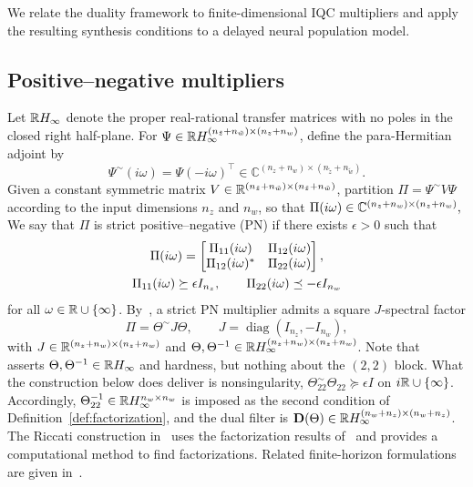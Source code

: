 We relate the duality framework to finite-dimensional IQC multipliers and
apply the resulting synthesis conditions to a delayed neural population
model.

\subsection{Positive--negative multipliers}

Let $\mathbb{R} H_\infty$ denote the proper real-rational transfer matrices with
no poles in the closed right half-plane. For
$\Psi\in\mathbb{R} H_\infty^{(n_{\tilde z}+n_{\tilde w})\times(n_z+n_w)}$,
define the para-Hermitian adjoint by
\begin{equation*}
 \Psi^\sim(i\omega)=\Psi(-i\omega)^\top
 \in\mathbb C^{(n_z+n_w)\times(n_{\tilde z}+n_{\tilde w})}.
\end{equation*}
Given a constant symmetric matrix
$V\in\mathbb{R}^{(n_{\tilde z}+n_{\tilde w})\times(n_{\tilde z}+n_{\tilde w})}$,
partition $\Pi=\Psi^\sim V\Psi$ according to the input dimensions
$n_z$ and $n_w$, so that \(
 \Pi(i\omega)\in\mathbb C^{(n_z+n_w)\times(n_z+n_w)},\\
\)
We say that $\Pi$ is strict positive--negative (PN)
if there exists $\epsilon>0$ such that
\begin{equation*}
 \begin{gathered}
 \Pi(i\omega)=
 \begin{bmatrix}\Pi_{11}(i\omega)&\Pi_{12}(i\omega)\\
       \Pi_{12}(i\omega)^*&\Pi_{22}(i\omega)\end{bmatrix},\\
 \Pi_{11}(i\omega)\succeq\epsilon I_{n_z},\qquad
 \Pi_{22}(i\omega)\preceq-\epsilon I_{n_w}
 \end{gathered}
\end{equation*}
for all $\omega\in\mathbb{R}\cup\{\infty\}$. By~\cite[Thm.~4]{6915700}, a
strict PN multiplier admits a square $J$-spectral factor
\begin{equation*}
\Pi=\Theta^\sim J\Theta,
 \qquad J=\operatorname{diag}(I_{n_z},-I_{n_w}),
\end{equation*}
with $J\in\mathbb{R}^{(n_z+n_w)\times(n_z+n_w)}$ and
$\Theta,\Theta^{-1}\in\mathbb{R} H_\infty^{(n_z+n_w)\times(n_z+n_w)}$.
Note that~\cite[Thm.~4]{6915700} asserts $\Theta,\Theta^{-1}\in\mathbb{R} H_\infty$
and hardness, but nothing about the $(2,2)$ block. What the construction
below does deliver is nonsingularity,
$\Theta_{22}^\sim\Theta_{22}\succeq\epsilon I$ on $i\mathbb{R}\cup\{\infty\}$.
Accordingly, $\Theta_{22}^{-1}\in\mathbb{R} H_\infty^{n_w\times n_w}$ is imposed
as the second condition of Definition~\ref{def:factorization}, and the dual filter is
$\mathbf{D}(\Theta)\in\mathbb{R} H_\infty^{(n_w+n_z)\times(n_w+n_z)}$. The Riccati construction 
in~\cite[App.~B]{Pfifer2015} uses the factorization results of~\cite{MEINSMA1995243}
and provides a computational method to find factorizations. Related
finite-horizon formulations are given in~\cite{carrasco2018equivalence,scherer2018dynamicdissipation}.

